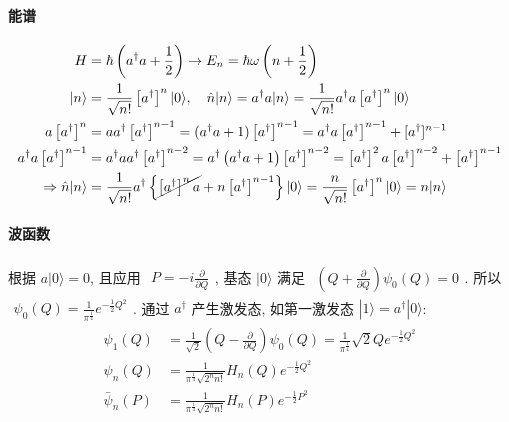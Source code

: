 \documentclass[../../main.tex]{subfiles}
\begin{document}
\paragraph{能谱}
\begin{align*}
    H &= \hbar\left(a^{\dagger}a + \frac{1}{2}\right)\rightarrow E_{n} = \hbar\omega\left(n+\frac{1}{2}\right)\\
    |n\rangle &= \frac{1}{\sqrt{n!}}\left[a^{\dagger}\right]^{n}|0\rangle,\quad \hat{n}|n\rangle = a^{\dagger}a|n\rangle = \frac{1}{\sqrt{n!}}a^{\dagger}a\left[a^{\dagger}\right]^{n}|0\rangle\\
    a\left[a^{\dagger}\right]^{n} &= aa^{\dagger}\left[a^{\dagger}\right]^{n-1} = (a^{\dagger}a + 1)\left[a^{\dagger}\right]^{n-1} = a^{\dagger}a\left[a^{\dagger}\right]^{n-1} + [a^{\dagger}]^{n-1}\\
    a^{\dagger}a\left[a^{\dagger}\right]^{n-1} &= a^{\dagger}aa^{\dagger}\left[a^{\dagger}\right]^{n-2} = a^{\dagger}\left(a^{\dagger}a + 1\right)\left[a^{\dagger}\right]^{n-2} = \left[a^{\dagger}\right]^{2}a\left[a^{\dagger}\right]^{n-2} + \left[a^{\dagger}\right]^{n-1}\\
    \Rightarrow \hat{n}|n\rangle &= \frac{1}{\sqrt{n!}}a^{\dagger}\left\{\cancel{\left[a^{\dagger}\right]^{n}a} + n\left[a^{\dagger}\right]^{n-1}\right\}|0\rangle = \frac{n}{\sqrt{n!}}\left[a^{\dagger}\right]^{n}|0\rangle = n|n\rangle
\end{align*}
\paragraph{波函数}
根据 $a|0\rangle = 0$, 且应用 $\begin{aligned}
    P = -i\frac{\partial}{\partial Q}
\end{aligned}$, 基态 $|0\rangle$ 满足 $\begin{aligned}
    \left(Q + \frac{\partial}{\partial Q}\right)\psi_{0}(Q) = 0
\end{aligned}$. 所以 $\begin{aligned}
    \psi_{0}(Q) = \frac{1}{\pi^{\frac{1}{4}}}e^{-\frac{1}{2}Q^{2}}
\end{aligned}$. 通过 $a^{\dagger}$ 产生激发态, 如第一激发态 $|1\rangle = a^{\dagger}|0\rangle$:
\begin{align*}
    \psi_{1}(Q) &= \frac{1}{\sqrt{2}}\left(Q - \frac{\partial}{\partial Q}\right)\psi_{0}(Q) = \frac{1}{\pi^{\frac{1}{4}}}\sqrt{2}Q e^{-\frac{1}{2}Q^{2}}\\
    \psi_{n}(Q) &= \frac{1}{\pi^{\frac{1}{4}}\sqrt{2^{n}n!}}H_{n}(Q)e^{-\frac{1}{2}Q^{2}}\\
    \bar{\psi}_{n}(P) &= \frac{1}{\pi^{\frac{1}{4}}\sqrt{2^{n}n!}}H_{n}(P)e^{-\frac{1}{2}P^{2}}
\end{align*}
\end{document}
